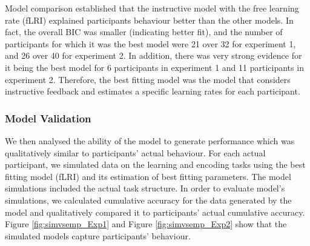 \documentclass[a4paper,12pt]{article} 			%
\begin{document}
\begin{table} 
    \centering 
    \caption{\label{tab:ModelComp}Model Comparison. BIC values and standard errors for each model for Experiment 1 and experiment 2. \textit{Best(N)} and \textit{Very strong(N)} refer to the number of participants for which the model was the best fit and for which there was very strong evidence, respectively   }
    \end{table}

Model comparison established that the instructive model with the free learning rate (fLRI) explained participants behaviour better than the other models. In fact, the overall BIC was smaller (indicating better fit), and the number of participants for which it was the best model were 21 over 32 for experiment 1, and 26 over 40 for experiment 2. In addition, there was very strong evidence for it being the best model for 6 participants in experiment 1 and 11 participants in experiment 2. Therefore, the best fitting model was the model that considers instructive feedback and estimates a specific learning rates for each participant.  

\subsubsection{Model Validation}
We then analysed the ability of the model to generate performance which was qualitatively similar to participants' actual behaviour. For each actual participant, we simulated data on the learning and encoding tasks using the best fitting model (fLRI) and its estimation of best fitting parameters. The model simulations included the actual task structure. In order to evaluate model's simulations, we calculated cumulative accuracy for the data generated by the model and qualitatively compared it to participants' actual cumulative accuracy. Figure \ref{fig:simvsemp_Exp1} and Figure \ref{fig:simvsemp_Exp2} show that the simulated models capture participants' behaviour.
\end{document}
